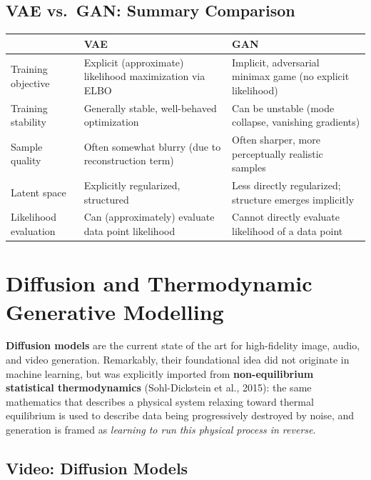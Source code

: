 \documentclass[12pt,a4paper]{article}
\begin{document}
\subsection{VAE vs.\ GAN: Summary Comparison}

\begin{center}
\renewcommand{\arraystretch}{1.3}
\begin{tabular}{|l|p{5.0cm}|p{5.0cm}|}
\hline
& \textbf{VAE} & \textbf{GAN} \\
\hline
Training objective & Explicit (approximate) likelihood maximization via ELBO & Implicit, adversarial minimax game (no explicit likelihood) \\
Training stability & Generally stable, well-behaved optimization & Can be unstable (mode collapse, vanishing gradients) \\
Sample quality & Often somewhat blurry (due to reconstruction term) & Often sharper, more perceptually realistic samples \\
Latent space & Explicitly regularized, structured & Less directly regularized; structure emerges implicitly \\
Likelihood evaluation & Can (approximately) evaluate data point likelihood & Cannot directly evaluate likelihood of a data point \\
\hline
\end{tabular}
\end{center}

\newpage

\section{Diffusion and Thermodynamic Generative Modelling}

\textbf{Diffusion models} are the current state of the art for high-fidelity image, audio, and video generation. Remarkably, their foundational idea did not originate in machine learning, but was explicitly imported from \textbf{non-equilibrium statistical thermodynamics} (Sohl-Dickstein et al., 2015): the same mathematics that describes a physical system relaxing toward thermal equilibrium is used to describe data being progressively destroyed by noise, and generation is framed as \emph{learning to run this physical process in reverse}.

\subsection{Video: Diffusion Models}
\end{document}
